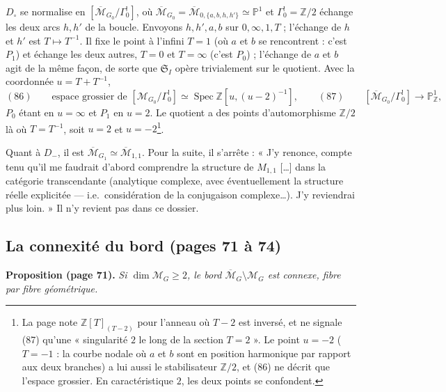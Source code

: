 \documentclass[11pt,a4paper]{article}
\begin{document}
$D_\circ$ se normalise en $[\overline{\mathcal{M}}_{G_0}/\Gamma^{!}_0]$, où
$\overline{\mathcal{M}}_{G_0} = \overline{\mathcal{M}}_{0, \{a, b, h, h'\}}
\simeq \mathbb{P}^1$ et $\Gamma^{!}_0 = \mathbb{Z}/2$ échange les deux arcs $h,
h'$ de la boucle. Envoyons $h, h', a, b$ sur $0, \infty, 1, T$ ; l'échange de $h$
et $h'$ est $T \mapsto T^{-1}$. Il fixe le point à l'infini $T = 1$ (où $a$ et
$b$ se rencontrent : c'est $P_1$) et échange les deux autres, $T = 0$ et $T =
\infty$ (c'est $P_0$) ; l'échange de $a$ et $b$ agit de la même façon, de sorte
que $\mathfrak{S}_I$ opère trivialement sur le quotient. Avec la coordonnée $u =
T + T^{-1}$,
\[
(86) \qquad \text{espace grossier de } [\mathcal{M}_{G_0}/\Gamma^{!}_0] \simeq
\operatorname{Spec} \mathbb{Z}[u, (u - 2)^{-1}], \qquad (87) \qquad
[\overline{\mathcal{M}}_{G_0}/\Gamma^{!}_0] \to \mathbb{P}^1_{\mathbb{Z}},
\]
$P_0$ étant en $u = \infty$ et $P_1$ en $u = 2$. Le quotient a des points
d'automorphisme $\mathbb{Z}/2$ là où $T = T^{-1}$, soit $u = 2$ et $u =
-2$\footnote{La page note $\mathbb{Z}[T]_{(T-2)}$ pour l'anneau où $T - 2$ est
inversé, et ne signale (87) qu'une « singularité $2$ le long de la section $T =
2$ ». Le point $u = -2$ ($T = -1$ : la courbe nodale où $a$ et $b$ sont en
position harmonique par rapport aux deux branches) a lui aussi le stabilisateur
$\mathbb{Z}/2$, et (86) ne décrit que l'espace grossier. En caractéristique $2$,
les deux points se confondent.}.

Quant à $D_-$, il est $\overline{\mathcal{M}}_{G_1} \simeq
\overline{\mathcal{M}}_{1,1}$. Pour la suite, il s'arrête : « J'y renonce, compte
tenu qu'il me faudrait d'abord comprendre la structure de $M_{1,1}$ […] dans la
catégorie transcendante (analytique complexe, avec éventuellement la structure
réelle explicitée — i.e.\ considération de la conjugaison complexe…). J'y
reviendrai plus loin. » Il n'y revient pas dans ce dossier.

\subsection*{La connexité du bord (pages 71 à 74)}

\textbf{Proposition (page 71).} \emph{Si $\dim \mathcal{M}_G \geq 2$, le bord
$\overline{\mathcal{M}}_G \setminus \mathcal{M}_G$ est connexe, fibre par fibre
géométrique.}
\end{document}
